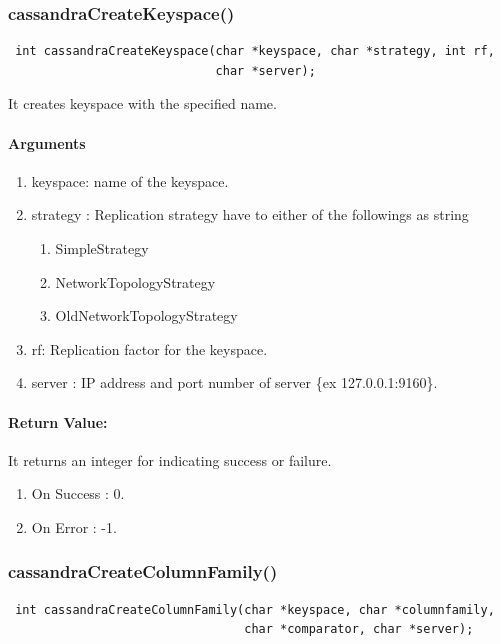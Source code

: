 \subsubsection{cassandraCreateKeyspace()}
\begin{verbatim}
 int cassandraCreateKeyspace(char *keyspace, char *strategy, int rf, 
                             char *server);
\end{verbatim}

  It creates keyspace with the specified name.

  \paragraph{Arguments}
  \begin{enumerate}
   \item keyspace: name of the keyspace.
   \item strategy : Replication strategy have to either of the followings as string
		    \begin{enumerate}
		     \item SimpleStrategy
		     \item NetworkTopologyStrategy
		     \item OldNetworkTopologyStrategy
		    \end{enumerate}

   \item rf:       Replication factor for the keyspace.
   \item server : IP address and port number of server \{ex 127.0.0.1:9160\}.
  \end{enumerate}

 \paragraph{Return Value:}
 It returns an integer for indicating success or failure.
\begin{enumerate}
 \item On Success : 0.
 \item On Error   : -1.
\end{enumerate}

\subsubsection{cassandraCreateColumnFamily()}
\begin{verbatim}
 int cassandraCreateColumnFamily(char *keyspace, char *columnfamily,
                                 char *comparator, char *server);
\end{verbatim}

